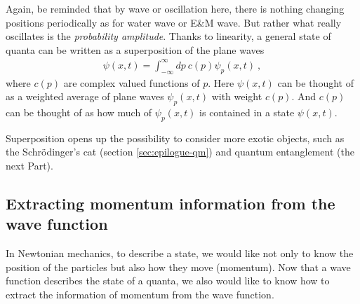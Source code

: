 {    Again, be reminded that by wave or oscillation here, there is nothing changing positions periodically as for water wave or E\&M wave. But rather what really oscillates is the \emph{probability amplitude}.
    \tcblower
    Thanks to linearity, a general state of quanta can be written as a superposition of the plane waves
    \begin{align}
        \label{eq:superposition_plane_wave_psi}
        \psi(x,t) = \int_{-\infty}^{\infty} dp ~ c(p) \psi_p(x,t)~,
    \end{align}
    where $c(p)$ are complex valued functions of $p$. Here $\psi(x,t)$ can be thought of as a weighted average of plane waves $\psi_p(x,t)$ with weight $c(p)$. And $c(p)$ can be thought of as how much of $\psi_p(x,t)$ is contained in a state $\psi(x,t)$.
}


Superposition opens up the possibility to consider more exotic objects, such as the Schr{\"o}dinger's cat (section \ref{sec:epilogue-qm}) and quantum entanglement (the next Part). 

\subsection{Extracting momentum information from the wave function} \label{sec:wave-func-momentum}

In Newtonian mechanics, to describe a state, we would like not only to know the position of the particles but also how they move (momentum). Now that a wave function describes the state of a quanta, we also would like to know how to extract the information of momentum from the wave function.


